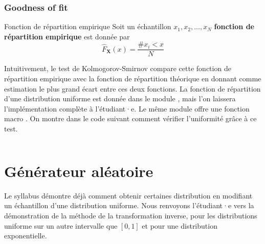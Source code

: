             \subsubsection{Goodness of fit}
                \begin{definition}{Fonction de répartition empirique}
                    Soit un échantillon $x_1, x_2, ..., x_N$ \textbf{fonction de répartition empirique} est donnée par
                    \begin{equation}
                        \hat{F}_{\mathbf{X}}(x) = \frac{\#x_i < x}{N}
                    \end{equation}
                \end{definition}

                Intuitivement, le test de Kolmogorov-Smirnov compare cette fonction de répartition empirique avec la fonction de répartition théorique en donnant comme estimation le plus grand écart entre ces deux fonctions. La fonction de répartition d'une distribution uniforme est donnée dans le module , mais l'on laissera l'implémentation complète à l'étudiant·e. Le même module offre une fonction macro . On montre dans le code suivant comment vérifier l'uniformité grâce à ce test.
                \inputminted{python}{codes/goodness_of_fit.py}
            
    \section{Générateur aléatoire}
        Le syllabus démontre déjà comment obtenir certaines distribution en modifiant un échantillon d'une distribution uniforme. Nous renvoyons l'étudiant·e vers la démonstration de la méthode de la transformation inverse, pour les distributions uniforme sur un autre intervalle que $[0, 1]$ et pour une distribution exponentielle.
